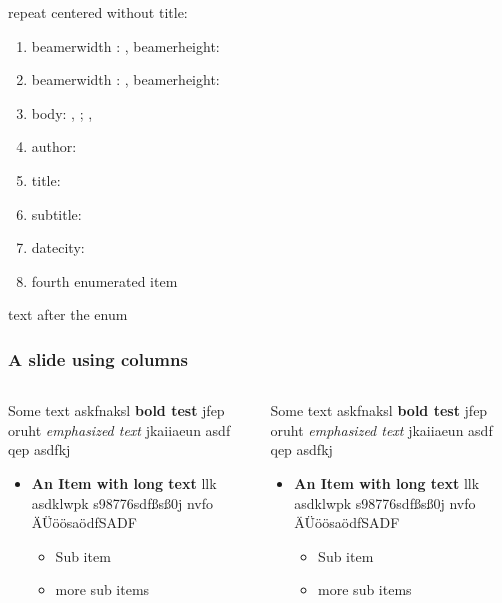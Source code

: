 \documentclass[german,aspectratio=169,notoc,titlestyle=tud,draft]{tudbeamer}%
\begin{document}
\begin{frame}
	repeat centered without title:
	\begin{enumerate}
		\item beamerwidth : \the\paperwidth, beamerheight: \the\paperheight
		\item beamerwidth : \number\paperwidth, beamerheight:\number\paperheight
		\item body: \the\bodyx, \the\bodyy; \the\bodywidth, \the\bodywidth
		\item author: \insertauthor
		\item title: \inserttitle
		\item subtitle: \insertsubtitle
		\item datecity: \insertdatecity
		\item fourth enumerated item
	\end{enumerate}
	text after the enum
\end{frame}
\begin{frame}[t]
	\frametitle{A slide using columns}
	\begin{columns}
	   	\begin{column}{.5\textwidth}
	   		Some text askfnaksl \textbf{bold test} jfep oruht \emph{emphasized text} jkaiiaeun asdf qep  asdfkj  
	   		\begin{itemize}
	   			\item \textbf{An Item with long text} llk asdklwpk s98776sdfßsß0j nvfo ÄÜöösaödfSADF
	   			\begin{itemize}
	   				\item Sub item
	   				\item more sub items
	   			\end{itemize}
	   		\end{itemize}
		\end{column}
	   	\begin{column}{.5\textwidth}
	   		Some text askfnaksl \textbf{bold test} jfep oruht \emph{emphasized text} jkaiiaeun asdf qep  asdfkj  
	   		\begin{itemize}
	   			\item \textbf{An Item with long text} llk asdklwpk s98776sdfßsß0j nvfo ÄÜöösaödfSADF
	   			\begin{itemize}
	   				\item Sub item
	   				\item more sub items
	   			\end{itemize}
	   		\end{itemize}
		\end{column}
	\end{columns}
\end{frame}
\end{document}
